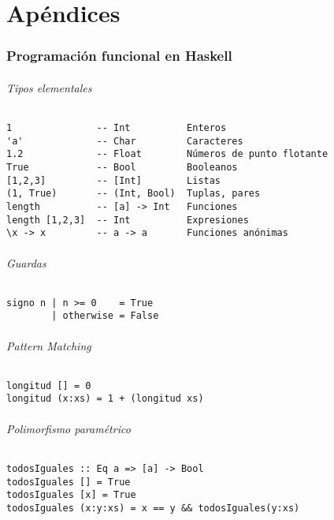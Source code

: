 \part{Apéndices}


\section{Programación funcional en Haskell}
\paragraph{Tipos elementales}
\begin{centrado}
	\begin{verbatim}
1               -- Int          Enteros
'a'             -- Char         Caracteres
1.2             -- Float        Números de punto flotante
True            -- Bool         Booleanos
[1,2,3]         -- [Int]        Listas
(1, True)       -- (Int, Bool)  Tuplas, pares
length          -- [a] -> Int   Funciones
length [1,2,3]  -- Int          Expresiones
\x -> x         -- a -> a       Funciones anónimas
	\end{verbatim}
\end{centrado}

\paragraph{Guardas}
\begin{centrado}
	\begin{verbatim}
signo n | n >= 0    = True
		| otherwise = False
	\end{verbatim}
\end{centrado}

\paragraph{Pattern Matching}
\begin{centrado}
	\begin{verbatim}
longitud [] = 0
longitud (x:xs) = 1 + (longitud xs)
	\end{verbatim}
\end{centrado}

\paragraph{Polimorfismo paramétrico}
\begin{centrado}
	\begin{verbatim}
todosIguales :: Eq a => [a] -> Bool
todosIguales [] = True
todosIguales [x] = True
todosIguales (x:y:xs) = x == y && todosIguales(y:xs)
	\end{verbatim}
\end{centrado}

